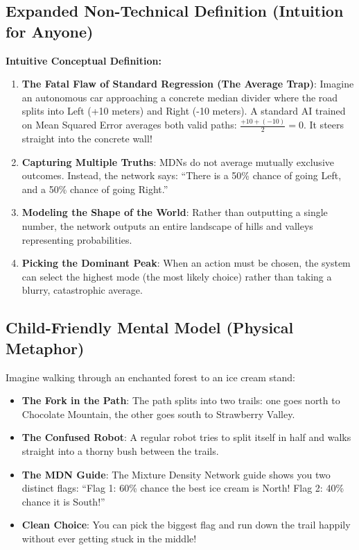 \documentclass[11pt,a4paper]{article}
\theoremstyle{definition}
\begin{document}
\subsection{Expanded Non-Technical Definition (Intuition for Anyone)}
\textbf{Intuitive Conceptual Definition:}
\begin{enumerate}
    \item \textbf{The Fatal Flaw of Standard Regression (The Average Trap)}: Imagine an autonomous car approaching a concrete median divider where the road splits into Left (+10 meters) and Right (-10 meters). A standard AI trained on Mean Squared Error averages both valid paths: $\frac{+10 + (-10)}{2} = 0$. It steers straight into the concrete wall!
    \item \textbf{Capturing Multiple Truths}: MDNs do not average mutually exclusive outcomes. Instead, the network says: ``There is a 50\% chance of going Left, and a 50\% chance of going Right.''
    \item \textbf{Modeling the Shape of the World}: Rather than outputting a single number, the network outputs an entire landscape of hills and valleys representing probabilities.
    \item \textbf{Picking the Dominant Peak}: When an action must be chosen, the system can select the highest mode (the most likely choice) rather than taking a blurry, catastrophic average.
\end{enumerate}

\subsection{Child-Friendly Mental Model (Physical Metaphor)}
Imagine walking through an enchanted forest to an ice cream stand:
\begin{itemize}
    \item \textbf{The Fork in the Path}: The path splits into two trails: one goes north to Chocolate Mountain, the other goes south to Strawberry Valley.
    \item \textbf{The Confused Robot}: A regular robot tries to split itself in half and walks straight into a thorny bush between the trails.
    \item \textbf{The MDN Guide}: The Mixture Density Network guide shows you two distinct flags: ``Flag 1: 60\% chance the best ice cream is North! Flag 2: 40\% chance it is South!''
    \item \textbf{Clean Choice}: You can pick the biggest flag and run down the trail happily without ever getting stuck in the middle!
\end{itemize}
\end{document}
